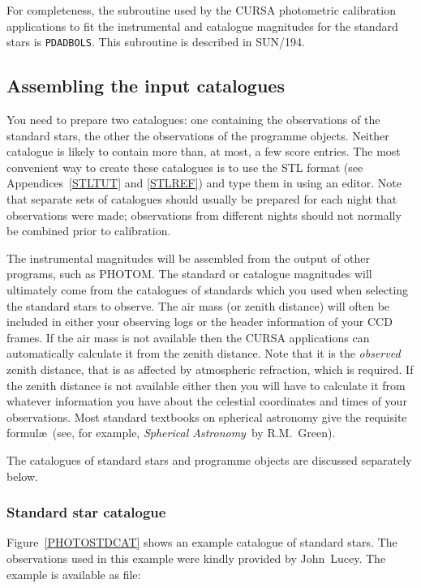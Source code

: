 \documentclass[twoside,11pt]{article}
\newcommand{\xref}[3]{#1}
\renewcommand{\_}{\texttt{\symbol{95}}}
\begin{document}
For completeness, the subroutine used by the CURSA photometric
calibration applications to fit the instrumental and catalogue magnitudes
for the standard stars is {\tt PDA\_DBOLS}.  This subroutine is
described in \xref{SUN/194}{sun194}{}\cite{SUN194}.

\subsection{Assembling the input catalogues}

You need to prepare two catalogues: one containing the observations of
the standard stars, the other the observations of the programme objects.
Neither catalogue is likely to contain more than, at most, a few score
entries.  The most convenient way to create these catalogues is to
use the STL format (see Appendices~\ref{STLTUT} and \ref{STLREF}) and
type them in using an editor.  Note that separate sets of catalogues
should usually be prepared for each night that observations were made;
observations from different nights should not normally be combined
prior to calibration.

The instrumental magnitudes will be assembled from the output of other
programs, such as PHOTOM.  The standard or catalogue magnitudes will
ultimately come from the catalogues of standards which you used when
selecting the standard stars to observe.  The air mass (or zenith
distance) will often be included in either your observing logs or the
header information of your CCD frames.  If the air mass is not available
then the CURSA applications can automatically calculate it from the
zenith distance.  Note that it is the {\it observed}\, zenith distance,
that is as affected by atmospheric refraction, which is required.
If the zenith distance is not available either then you will have to
calculate it from whatever information you have about the celestial
coordinates and times of your observations.  Most standard textbooks on
spherical astronomy give the requisite formul\ae\ (see, for example,
{\it Spherical Astronomy}\, by R.M.~Green\cite{GREEN}).

The catalogues of standard stars and programme objects are discussed
separately below.

\subsubsection{Standard star catalogue}

Figure~\ref{PHOTOSTDCAT} shows an example catalogue of standard stars.
The observations used in this example were kindly provided by
John~Lucey.  The example is available as file:
\end{document}
